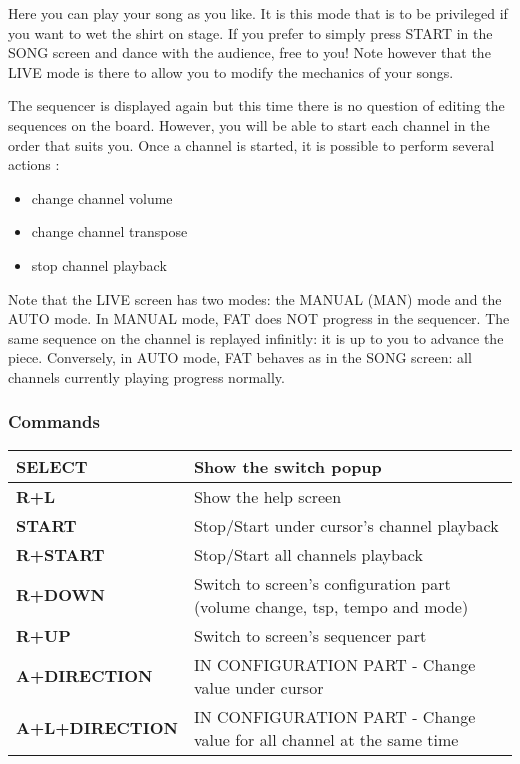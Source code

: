 Here you can play your song as you like.
It is this mode that is to be privileged if you want to wet the shirt on stage.
If you prefer to simply press START in the SONG screen and dance with the audience, free to you!
Note however that the LIVE mode is there to allow you to modify the mechanics of your songs.


The sequencer is displayed again but this time there is no question of editing the sequences on the board.
However, you will be able to start each channel in the order that suits you.
Once a channel is started, it is possible to perform several actions :
\medskip

\begin{itemize}
    \item{change channel volume}
    \item{change channel transpose}
    \item{stop channel playback}
\end{itemize}
\medskip

Note that the LIVE screen has two modes: the MANUAL (MAN) mode and the AUTO mode.
In MANUAL mode, FAT does NOT progress in the sequencer. The same sequence on the channel is replayed infinitly: it is up to you to advance the piece.
Conversely, in AUTO mode, FAT behaves as in the SONG screen: all channels currently playing progress normally.
\newpage %
\subsubsection{Commands}
\begin{supertabular}{|l|p{10cm}|}
    {\bf SELECT} & Show the switch popup \\
    \hline
    {\bf R+L} & Show the help screen \\
    \hline
    {\bf START} & Stop/Start under cursor's channel playback \\
    \hline
    {\bf R+START} & Stop/Start all channels playback \\
    \hline
    {\bf R+DOWN} & Switch to screen's configuration part (volume change, tsp, tempo and mode) \\
    \hline
    {\bf R+UP} & Switch to screen's sequencer part \\
    \hline
    {\bf A+DIRECTION} & IN CONFIGURATION PART - Change value under cursor \\
    \hline
    {\bf A+L+DIRECTION} & IN CONFIGURATION PART - Change value for all channel at the same time \\
\end{supertabular}

